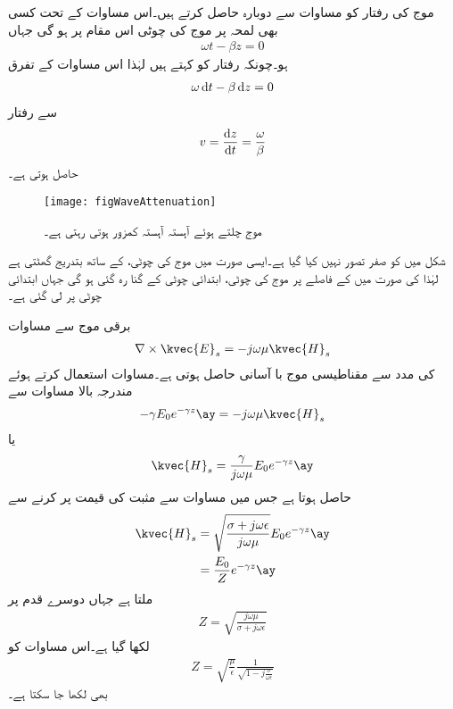 موج کی رفتار کو مساوات  سے دوبارہ حاصل کرتے ہیں۔اس مساوات کے تحت کسی بھی لمحہ  پر موج کی چوٹی اس مقام پر ہو گی جہاں
\begin{align*}
\omega t -\beta z=0
\end{align*}
ہو۔چونکہ رفتار  کو کہتے ہیں لہٰذا اس مساوات کے تفرق
\begin{align*}
\omega \dif t-\beta \dif z=0
\end{align*}
سے رفتار
\begin{align}
v=\frac{\dif z}{\dif t}=\frac{\omega}{\beta}
\end{align}
حاصل ہوتی ہے۔

\begin{figure}
\centering
\texttt{[image: figWaveAttenuation]}
\caption{موج چلتے ہوئے آہستہ آہستہ کمزور ہوتی رہتی ہے۔}
\label{شکل_موج_کمزوری}
\end{figure}

شکل  میں  کو صفر تصور نہیں کیا گیا ہے۔ایسی صورت میں موج کی چوٹی،  کے ساتھ بتدریج گھٹتی  ہے لہٰذا  کی صورت میں  کے فاصلے پر موج کی چوٹی، ابتدائی چوٹی کے  گنا رہ گئی ہو گی جہاں ابتدائی چوٹی  پر لی گئی ہے۔

برقی موج  سے مساوات 
\begin{align*}
\nabla \times \kvec{E}_{s}=-j \omega \mu \kvec{H}_{s}
\end{align*}
 کی مدد سے مقناطیسی موج با آسانی حاصل ہوتی ہے۔مساوات  استعمال کرتے ہوئے مندرجہ بالا مساوات سے
\begin{align*}
-\gamma E_0 e^{-\gamma z} \ay=-j \omega \mu \kvec{H}_s
\end{align*}
یا
\begin{align*}
\kvec{H}_s=\frac{\gamma}{j \omega \mu} E_0 e^{-\gamma z} \ay
\end{align*}
حاصل ہوتا ہے جس میں مساوات  سے مثبت  کی قیمت پر کرنے سے
\begin{gather}
\begin{aligned}\label{مساوات_موج_مقناطیسی_جزو}
\kvec{H}_s&=\sqrt{\frac{\sigma +j \omega \epsilon}{j \omega \mu}} E_0 e^{-\gamma z} \ay\\
&=\frac{E_0}{Z} e^{-\gamma z}\ay
\end{aligned}
\end{gather}
ملتا ہے جہاں دوسرے قدم پر
\begin{align}\label{مساوات-موج_قدرتی_رکاوٹ}
Z =\sqrt{\frac{j \omega \mu}{\sigma +j \omega \epsilon}}
\end{align}
لکھا  گیا ہے۔اس مساوات کو
\begin{align}\label{مساوات-موج_قدرتی_رکاوٹ_ب}
Z =\sqrt{\frac{\mu}{\epsilon}}\frac{1}{\sqrt{1-j \frac{\sigma}{\omega \epsilon}}}
\end{align}
بھی لکھا جا سکتا ہے۔

